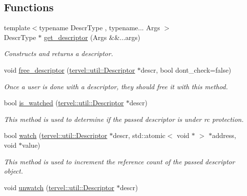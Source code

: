 \subsection*{Functions}
\begin{DoxyCompactItemize}
\item 
{\footnotesize template$<$typename Descr\+Type , typename... Args $>$ }\\Descr\+Type $\ast$ \hyperlink{namespacetervel_1_1util_1_1memory_1_1rc_a38e02080a32927b40a7ac60e1edd4fbf}{get\+\_\+descriptor} (Args \&\&...args)
\begin{DoxyCompactList}\small\item\em Constructs and returns a descriptor. \end{DoxyCompactList}\item 
void \hyperlink{namespacetervel_1_1util_1_1memory_1_1rc_a97da2d57615625ad60e4bb151600fdd7}{free\+\_\+descriptor} (\hyperlink{classtervel_1_1util_1_1_descriptor}{tervel\+::util\+::\+Descriptor} $\ast$descr, bool dont\+\_\+check=false)
\begin{DoxyCompactList}\small\item\em Once a user is done with a descriptor, they should free it with this method. \end{DoxyCompactList}\item 
bool \hyperlink{namespacetervel_1_1util_1_1memory_1_1rc_adbd0694dc5f40b13ca31c143edee459f}{is\+\_\+watched} (\hyperlink{classtervel_1_1util_1_1_descriptor}{tervel\+::util\+::\+Descriptor} $\ast$descr)
\begin{DoxyCompactList}\small\item\em This method is used to determine if the passed descriptor is under rc protection. \end{DoxyCompactList}\item 
bool \hyperlink{namespacetervel_1_1util_1_1memory_1_1rc_a1dc4906c41f24991438c68e840c8b833}{watch} (\hyperlink{classtervel_1_1util_1_1_descriptor}{tervel\+::util\+::\+Descriptor} $\ast$descr, std\+::atomic$<$ void $\ast$ $>$ $\ast$address, void $\ast$value)
\begin{DoxyCompactList}\small\item\em This method is used to increment the reference count of the passed descriptor object. \end{DoxyCompactList}\item 
void \hyperlink{namespacetervel_1_1util_1_1memory_1_1rc_a0964016234e7d046cc64f44c5bc4f856}{unwatch} (\hyperlink{classtervel_1_1util_1_1_descriptor}{tervel\+::util\+::\+Descriptor} $\ast$descr)

\end{DoxyCompactItemize}
